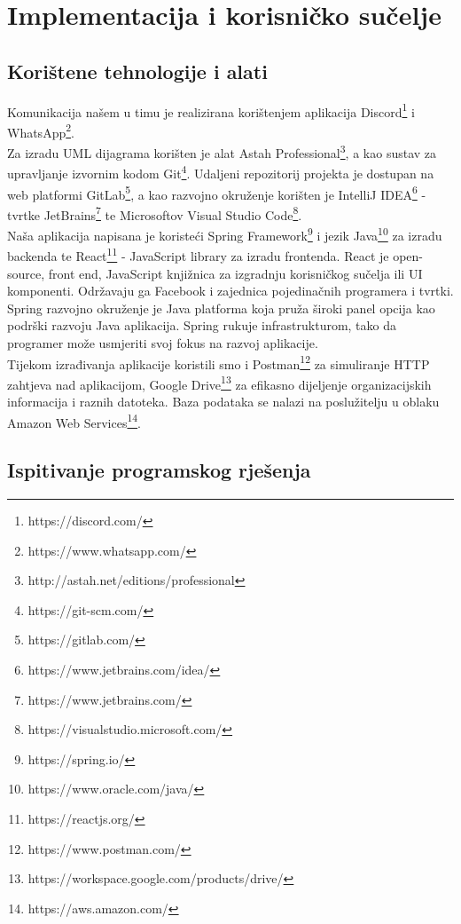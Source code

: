 
	
\chapter{Implementacija i korisničko sučelje}
		
		
		\section{Korištene tehnologije i alati}

		Komunikacija našem u timu je realizirana korištenjem aplikacija Discord\footnote{https://discord.com/} i WhatsApp\footnote{https://www.whatsapp.com/}.\\ Za izradu UML dijagrama korišten je alat Astah Professional\footnote{http://astah.net/editions/professional}, a kao sustav za upravljanje
izvornim kodom Git\footnote{https://git-scm.com/}. Udaljeni repozitorij projekta je dostupan na web platformi GitLab\footnote{https://gitlab.com/}, a kao razvojno okruženje korišten je IntelliJ IDEA\footnote{https://www.jetbrains.com/idea/} - tvrtke JetBrains\footnote{https://www.jetbrains.com/} te Microsoftov Visual Studio Code\footnote{https://visualstudio.microsoft.com/
}. 
	\\
	 Naša aplikacija napisana je koristeći Spring Framework\footnote{https://spring.io/} i jezik Java\footnote{https://www.oracle.com/java/} za izradu backenda te React\footnote{https://reactjs.org/} - JavaScript library za izradu frontenda. React je open-source, front end, JavaScript knjižnica za izgradnju korisničkog sučelja ili UI komponenti. Održavaju ga Facebook i zajednica pojedinačnih programera i tvrtki. Spring razvojno okruženje je Java platforma koja pruža široki panel opcija kao podrški
razvoju Java aplikacija. Spring rukuje infrastrukturom, tako da programer može usmjeriti svoj
fokus na razvoj aplikacije. \\
Tijekom izrađivanja aplikacije koristili smo i Postman\footnote{https://www.postman.com/} za simuliranje HTTP zahtjeva nad aplikacijom, Google Drive\footnote{https://workspace.google.com/products/drive/} za efikasno dijeljenje organizacijskih informacija i raznih datoteka. 
Baza podataka se nalazi na poslužitelju u oblaku Amazon
Web Services\footnote{https://aws.amazon.com/}.			
			
			\eject 
		
	
		\section{Ispitivanje programskog rješenja}

